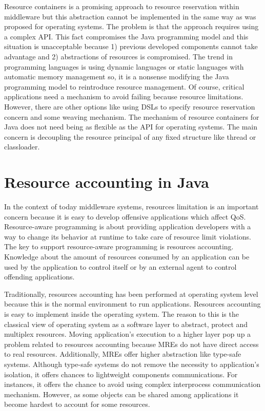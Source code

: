 Resource containers is a promising approach to resource reservation within middleware but this abstraction cannot be implemented in the same way as was proposed for operating systems. The problem is that the approach requires using a complex API. This fact compromises the Java programming model and this situation is unacceptable because 1) previous developed components cannot take advantage and 2) abstractions of resources is compromised. The trend in programming languages is using dynamic languages or static languages with automatic memory management so, it is a nonsense modifying the Java programming model to reintroduce resource management. Of course, critical applications need a mechanism to avoid failing because resource limitations. However, there are other options like using DSLs to specify resource reservation concern and some weaving mechanism. The mechanism of resource containers for Java does not need being as flexible as the API for operating systems. The main concern is decoupling the resource principal of any fixed structure like thread or classloader.

\section{Resource accounting in Java}
In the context of today middleware systems, resources limitation is an important concern because it is easy to develop offensive applications which affect QoS. Resource-aware programming is about providing application developers with a way to change its behavior at runtime to take care of resource limit violations. The key to support resource-aware programming is resources accounting. Knowledge about the amount of resources consumed by an application can be used by the application to control itself or by an external agent to control offending applications.

Traditionally, resources accounting has been performed at operating system level because this is the normal environment to run applications. Resources accounting is easy to implement inside the operating system. The reason to this is the classical view of operating system as a software layer to abstract, protect and multiplex resources. Moving application's execution to a higher layer pop up a problem related to resources accounting because MREs do not have direct access to real resources. Additionally, MREs offer higher abstraction like type-safe systems. Although type-safe systems do not remove the necessity to application's isolation, it offers chances to lightweight components communications. For instances, it offers the chance to avoid using complex interprocess communication mechanism. However, as some objects can be shared among applications it become hardest to account for some resources.

